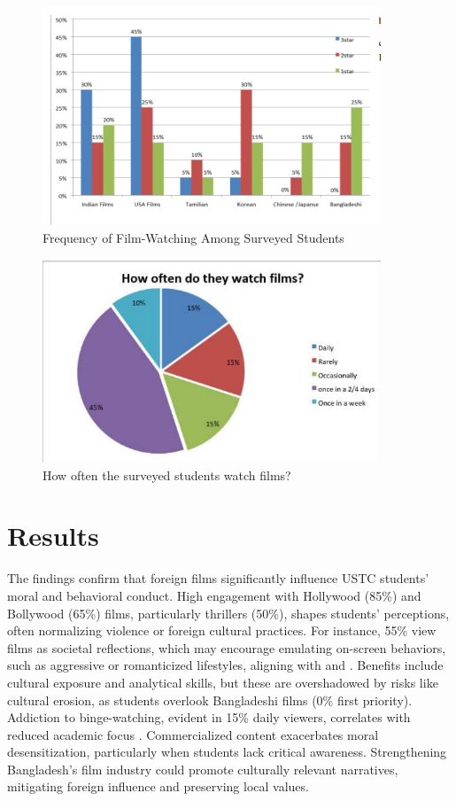 \documentclass[12pt]{article}
\begin{document}
\begin{figure}[H]
\centering
\includegraphics[width=0.9\textwidth]{1.png}
\caption{Frequency of Film-Watching Among Surveyed Students}
\label{fig:film_frequency}
\end{figure}

\begin{figure}[H]
\centering
\includegraphics[width=0.9\textwidth]{2.png}
\caption{How often the surveyed students watch films?}
\label{fig:watching_frequency}
\end{figure}
\clearpage
\section{Results}
The findings confirm that foreign films significantly influence USTC students’ moral and behavioral conduct. High engagement with Hollywood (85\%) and Bollywood (65\%) films, particularly thrillers (50\%), shapes students’ perceptions, often normalizing violence or foreign cultural practices. For instance, 55\% view films as societal reflections, which may encourage emulating on-screen behaviors, such as aggressive or romanticized lifestyles, aligning with \cite{johnson2016} and \cite{meltzoff1977}. Benefits include cultural exposure and analytical skills, but these are overshadowed by risks like cultural erosion, as students overlook Bangladeshi films (0\% first priority). Addiction to binge-watching, evident in 15\% daily viewers, correlates with reduced academic focus \cite{riddle2017}. Commercialized content exacerbates moral desensitization, particularly when students lack critical awareness. Strengthening Bangladesh’s film industry could promote culturally relevant narratives, mitigating foreign influence and preserving local values.
\end{document}
